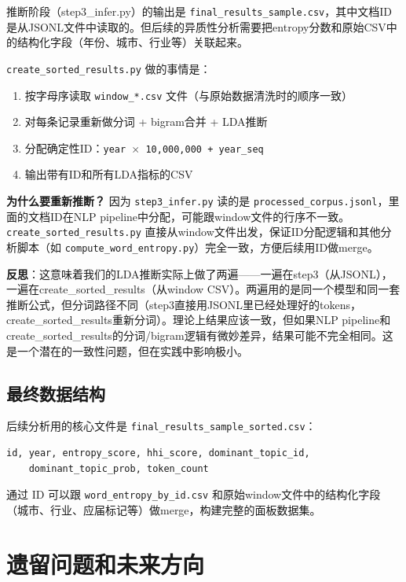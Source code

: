 \documentclass[12pt,a4paper]{ctexart}
\begin{document}
推断阶段（step3\_infer.py）的输出是 \texttt{final\_results\_sample.csv}，其中文档ID是从JSONL文件中读取的。但后续的异质性分析需要把entropy分数和原始CSV中的结构化字段（年份、城市、行业等）关联起来。

\texttt{create\_sorted\_results.py} 做的事情是：

\begin{enumerate}
\item 按字母序读取 \texttt{window\_*.csv} 文件（与原始数据清洗时的顺序一致）
\item 对每条记录重新做分词 + bigram合并 + LDA推断
\item 分配确定性ID：\texttt{year $\times$ 10,000,000 + year\_seq}
\item 输出带有ID和所有LDA指标的CSV
\end{enumerate}

\textbf{为什么要重新推断？} 因为 \texttt{step3\_infer.py} 读的是 \texttt{processed\_corpus.jsonl}，里面的文档ID在NLP pipeline中分配，可能跟window文件的行序不一致。\texttt{create\_sorted\_results.py} 直接从window文件出发，保证ID分配逻辑和其他分析脚本（如 \texttt{compute\_word\_entropy.py}）完全一致，方便后续用ID做merge。

\textbf{反思}：这意味着我们的LDA推断实际上做了两遍——一遍在step3（从JSONL），一遍在create\_sorted\_results（从window CSV）。两遍用的是同一个模型和同一套推断公式，但分词路径不同（step3直接用JSONL里已经处理好的tokens，create\_sorted\_results重新分词）。理论上结果应该一致，但如果NLP pipeline和create\_sorted\_results的分词/bigram逻辑有微妙差异，结果可能不完全相同。这是一个潜在的一致性问题，但在实践中影响极小。

\subsection{最终数据结构}

后续分析用的核心文件是 \texttt{final\_results\_sample\_sorted.csv}：

\begin{verbatim}
id, year, entropy_score, hhi_score, dominant_topic_id,
    dominant_topic_prob, token_count
\end{verbatim}

通过 ID 可以跟 \texttt{word\_entropy\_by\_id.csv} 和原始window文件中的结构化字段（城市、行业、应届标记等）做merge，构建完整的面板数据集。


\section{遗留问题和未来方向}
\label{sec:todo}
\end{document}
